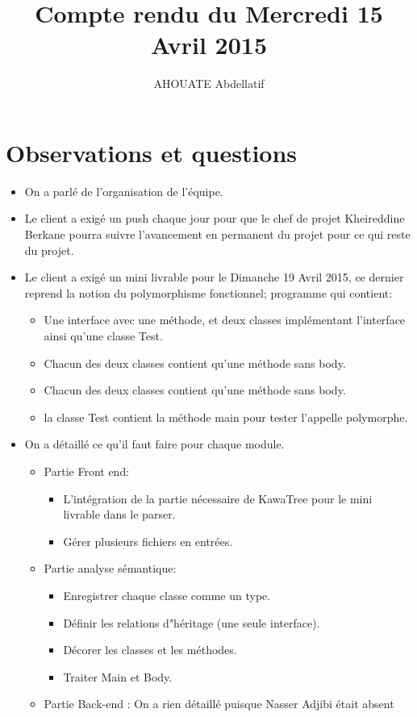 \documentclass{../../../../../res/rapport}
\author{AHOUATE Abdellatif}
\title{Compte rendu du Mercredi 15 Avril 2015}
\begin{document}
    \maketitle
    \tableofcontents
    \clearpage
    
    \section{Observations et questions} 
    \label{sec:observations_et_questions}
	\begin{itemize}
        \item On a parlé de l'organisation de l'équipe.
	\item Le client a exigé un push chaque jour pour que le chef de projet Kheireddine Berkane pourra suivre l'avancement en permanent du projet pour ce qui reste du projet.
	\item Le client a exigé un mini livrable pour le Dimanche 19 Avril 2015, ce dernier reprend la notion du polymorphisme fonctionnel; programme qui contient:
        	\begin{itemize}
        		\item Une interface avec une méthode, et deux classes implémentant l'interface ainsi qu'une classe Test. 
			\item Chacun des deux classes contient qu'une méthode sans body.
			\item Chacun des deux classes contient qu'une méthode sans body.
			\item la classe Test contient la méthode main pour tester l'appelle polymorphe.
        	\end{itemize} 
	\item On a détaillé ce qu'il faut faire pour chaque module.
		\begin{itemize}
        		\item Partie Front end:
 				\begin{itemize}
        				\item L'intégration de la partie nécessaire de KawaTree pour le mini livrable dans le parser. 
					\item Gérer plusieurs fichiers en entrées. 
					
        			\end{itemize}
			\item Partie analyse sémantique:
				\begin{itemize}
        				\item Enregistrer chaque classe comme un type.
					\item Définir les relations d"héritage (une seule interface).
					\item Décorer les classes et les méthodes.
					\item Traiter Main et Body. 					
        			\end{itemize}
			\item Partie Back-end : On a rien détaillé puisque Nasser Adjibi était absent 
			
        	\end{itemize} 
		
	\end{itemize}
\end{document}
